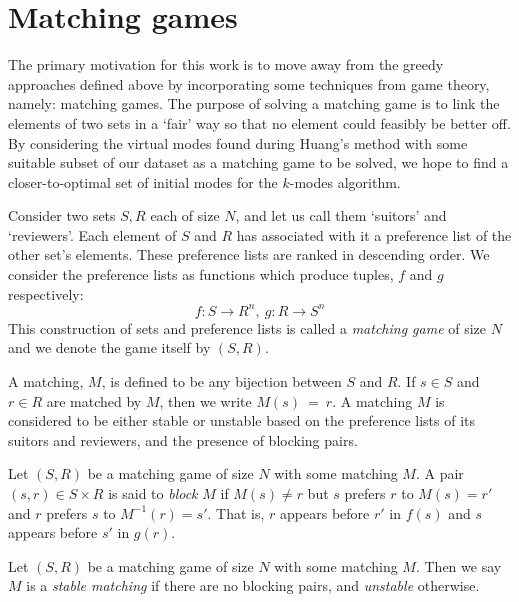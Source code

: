 \section{Matching games}\label{sec:matching}

The primary motivation for this work is to move away from the greedy approaches
defined above by incorporating some techniques from game theory, namely:
matching games. The purpose of solving a matching game is to link the elements
of two sets in a `fair' way so that no element could feasibly be better off. By
considering the virtual modes found during Huang's method with some suitable
subset of our dataset as a matching game to be solved, we hope to find a
closer-to-optimal set of initial modes for the \(k\)-modes algorithm.

\begin{definition}\label{def:matching_game}
    Consider two sets \(S, R\) each of size \(N\), and let us call them 
    `suitors' and `reviewers'. Each element of \(S\) and \(R\) has associated 
    with it a preference list of the other set's elements. These preference 
    lists are ranked in descending order. We consider the preference lists as 
    functions which produce tuples, \(f\) and \(g\) respectively:
	\[
	    f : S \to R^n, \ g : R \to S^n
	\]
	This construction of sets and preference lists is called a 
    \emph{matching game} of size \(N\) and we denote the game itself by 
    \((S,R)\).
	
    A matching, \(M\), is defined to be any bijection between \(S\) and \(R\). 
    If \(s \in S\) and \(r \in R\) are matched by \(M\), then we write
    \(M(s)~=~r\). A matching \(M\) is considered to be either stable or unstable
    based on the preference lists of its suitors and reviewers, and the presence
    of blocking pairs.
\end{definition}

\begin{definition}\label{def:blocking_pair}
    Let \((S, R)\) be a matching game of size \(N\) with some matching \(M\). A 
    pair \((s, r) \in S \times R\) is said to \emph{block} \(M\) if \(M(s) \neq
    r\) but \(s\) prefers \(r\) to \(M(s) = r'\) and \(r\) prefers \(s\) to
    \(M^{-1}(r) = s'\). That is, \(r\) appears before \(r'\) in \(f(s)\) and
    \(s\) appears before \(s'\) in \(g(r)\).
\end{definition}

\begin{definition}\label{def:stable_matching}
    Let \((S, R)\) be a matching game of size \(N\) with some matching \(M\). 
    Then we say \(M\) is a \emph{stable matching} if there are no blocking 
    pairs, and \emph{unstable} otherwise.
\end{definition}

